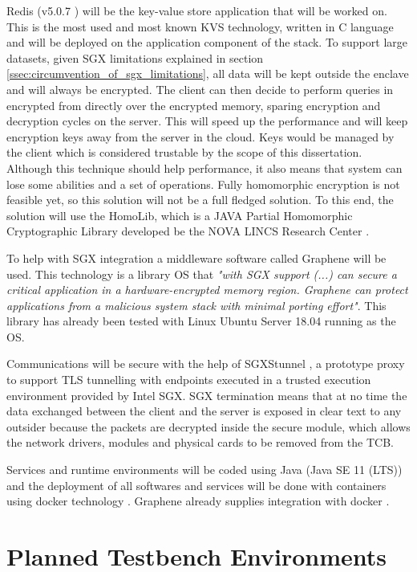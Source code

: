 Redis (v5.0.7 \cite{redis:1}) will be the key-value store application that will be worked on. This is the most used and most known \gls{KVS} technology, written in C language and will be deployed on the application component of the stack. To support large datasets, given \gls{SGX} limitations explained in section \ref{ssec:circumvention_of_sgx_limitations}, all data will be kept outside the enclave and will always be encrypted. The client can then decide to perform queries in encrypted from directly over the encrypted memory, sparing encryption and decryption cycles on the server. This will speed up the performance and will keep encryption keys away from the server in the cloud. Keys would be managed by the client which is considered trustable by the scope of this dissertation. Although this technique should help performance, it also means that system can lose some abilities and a set of operations. Fully homomorphic encryption is not feasible yet, so this solution will not be a full fledged solution. To this end, the solution will use the HomoLib, which is a JAVA Partial Homomorphic Cryptographic Library developed be the NOVA LINCS Research Center \cite{homolib:1}.

To help with \gls{SGX} integration a middleware software called Graphene \cite{graphene:1, graphene:2} will be used. This technology is a library \gls{OS} that \textit{"with \gls{SGX} support (...) can secure a critical application in a hardware-encrypted memory region. Graphene can protect applications from a malicious system stack with minimal porting effort"}. This library has already been tested with Linux Ubuntu Server 18.04 running as the \gls{OS}. 

Communications will be secure with the help of SGXStunnel \cite{sgxstunnel:1}, a prototype proxy to support TLS tunnelling with endpoints executed in a trusted execution environment provided by Intel SGX. \gls{SGX} termination means that at no time the data exchanged between the client and the server is exposed in clear text to any outsider because the packets are decrypted inside the secure module, which allows the network drivers, modules and physical cards to be removed from the \gls{TCB}.

Services and runtime environments will be coded using Java (Java SE 11 (LTS)) and the deployment of all softwares and services will be done with containers using docker technology \cite{docker:1}. Graphene already supplies integration with docker \cite{graphene_container:1}.

\section{Planned Testbench Environments} %
\label{sec:planned_testbench_environments}

